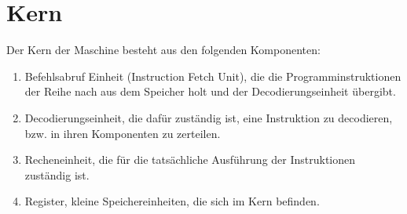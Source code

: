 \section{Kern}
\label{sec:Kern}

Der Kern der Maschine besteht aus den folgenden Komponenten:

\begin{enumerate}
  \item Befehlsabruf Einheit (Instruction Fetch Unit), die die
   Programminstruktionen der Reihe nach aus dem Speicher holt und der
   Decodierungseinheit übergibt.
  \item Decodierungseinheit, die dafür zuständig ist, eine Instruktion zu
    decodieren, bzw. in ihren Komponenten zu zerteilen.
  \item Recheneinheit, die für die tatsächliche Ausführung der Instruktionen
   zuständig ist. 
  \item Register, kleine Speichereinheiten, die sich im Kern befinden.
\end{enumerate}